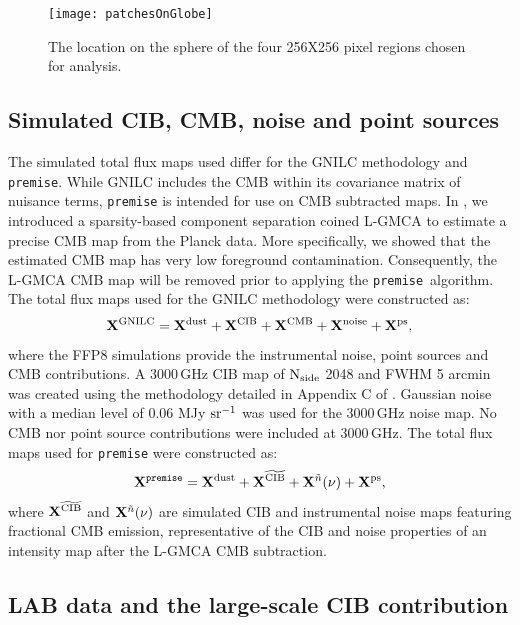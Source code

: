 \documentclass[a4paper,fleqn,usenatbib]{mnras}
\newcommand{\premise}{\texttt{premise}}
\begin{document}
\begin{figure}
	\centering
	\texttt{[image: patchesOnGlobe]}
	\caption{The location on the sphere of the four 256X256 pixel regions chosen for analysis.}
	\label{fig:globe}
\end{figure}

\subsection{Simulated CIB, CMB, noise and point sources}

The simulated total flux maps used differ for the GNILC methodology and {\texttt{premise}}. While GNILC includes the CMB within its covariance matrix of nuisance terms, {\texttt{premise}} is intended for use on CMB subtracted maps. In \cite{lgmca}, we introduced a sparsity-based component separation coined L-GMCA to estimate a precise CMB map from the Planck data. More specifically, we showed that the estimated CMB map has very low foreground contamination. Consequently, the L-GMCA CMB map will be removed prior to applying the \premise \, algorithm. The total flux maps used for the GNILC methodology were constructed as: 
\begin{eqnarray}
{\bf{X}}^{\rm{GNILC}} =  {\bf{X}}^{\rm{dust}} +  {\bf{X}}^{\rm{CIB}} +  {\bf{X}}^{\rm{CMB}}  +   {\bf{X}}^{\rm{noise}}  + {\bf{X}}^{\rm{ps}},
\label{eq:gnilcTotS}
\end{eqnarray}
where the FFP8 simulations provide the instrumental noise, point sources and CMB contributions. A 3000\,GHz CIB map of $\rm{N_{side}}$ 2048 and FWHM 5 arcmin was created using the methodology detailed in Appendix C of \citet{pr2}. Gaussian noise with a median level of 0.06 MJy $\rm{sr}^{-1}$ \citep{pr2} was used for the 3000\,GHz noise map. No CMB nor point source contributions were included at 3000\,GHz.
The total flux maps used for {\texttt{premise}} were constructed as: 
\begin{eqnarray}
{\bf{X}}^{\rm{{\texttt{premise}}}} = {\bf{X}}^{\rm{dust}} + {\bf{X}}^{\rm{\widetilde{CIB}}} +  {\bf{X}}^{\tilde{n}}(\nu)  + {\bf{X}}^{\rm{ps}},
\label{eq:waveTotS}
\end{eqnarray}
where ${\bf{X}}^{\rm{\widetilde{CIB}}}$  and ${\bf{X}}^{\tilde{n}}(\nu)$ are simulated CIB and instrumental noise maps featuring fractional CMB emission, representative of the CIB and noise properties of an intensity map after the L-GMCA CMB subtraction.

\subsection{LAB data and the large-scale CIB contribution}
\end{document}

